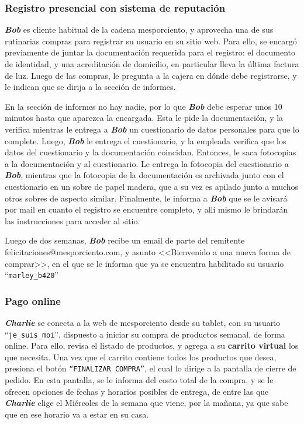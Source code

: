 \subsubsection{Registro presencial con sistema de reputación}

\textbf{\emph{Bob}} es cliente habitual de la cadena mesporciento, y aprovecha
una de sus rutinarias compras para registrar su usuario en su sitio web. Para
ello, se encargó previamente de juntar la documentación requerida para el
registro: el documento de identidad, y una acreditación de domicilio, en
particular lleva la última factura de luz. Luego de las compras, le pregunta a
la cajera en dónde debe registrarse, y le indican que se dirija a la sección de
informes.

En la sección de informes no hay nadie, por lo que \textbf{\emph{Bob}} debe
esperar unos 10 minutos hasta que aparezca la encargada. Esta le pide la
documentación, y la verifica mientras le entrega a \textbf{\emph{Bob}} un
cuestionario de datos personales para que lo complete. Luego,
\textbf{\emph{Bob}} le entrega el cuestionario, y la empleada verifica que los
datos del cuestionario y la documentación coincidan. Entonces, le saca
fotocopias a la documentación y al cuestionario. Le entrega la fotocopia del
cuestionario a \textbf{\emph{Bob}}, mientras que la fotocopia de la
documentación es archivada junto con el cuestionario en un sobre de papel
madera, que a su vez es apilado junto a muchos otros sobres de aspecto similar.
Finalmente, le informa a \textbf{\emph{Bob}} que se le avisará por mail en
cuanto el registro se encuentre completo, y allí mismo le brindarán las
instrucciones para acceder al sitio.

Luego de dos semanas, \textbf{\emph{Bob}} recibe un email de parte del remitente
felicitaciones@mesporciento.com, y asunto <<Bienvenido a una nueva forma de
comprar>>, en el que se le informa que ya se encuentra habilitado su usuario
``\texttt{marley\_b420}''

\subsubsection{Pago online}

\textbf{\emph{Charlie}} se conecta a la web de mesporciento desde su tablet, con
su usuario ``\texttt{je\_suis\_moi}'', dispuesto a iniciar su compra de
productos semanal, de forma online. Para ello, revisa el listado de productos, y
agrega a su \textbf{carrito virtual} los que necesita. Una vez que el carrito
contiene todos los productos que desea, presiona el botón \texttt{``FINALIZAR
COMPRA''}, el cual lo dirige a la pantalla de cierre de pedido. En esta
pantalla, se le informa del costo total de la compra, y se le ofrecen opciones
de fechas y horarios posibles de entrega, de entre las que
\textbf{\emph{Charlie}} elige el Miércoles de la semana que viene, por la
mañana, ya que sabe que en ese horario va a estar en su casa.

